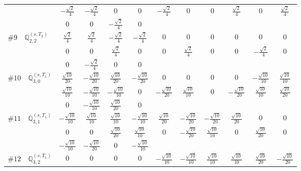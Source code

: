 \documentclass[fleqn,9pt,landscape]{jsarticle}
\begin{document}
\begin{center}
\begin{longtable}{lcccccccccc}
& $ - \frac{\sqrt{2}}{4} $ & $ - \frac{\sqrt{2}}{4} $ & $ 0 $ & $ 0 $ & $ - \frac{\sqrt{2}}{4} $ & $ 0 $ & $ 0 $ & $ \frac{\sqrt{2}}{4} $ & $ 0 $ & $ \frac{\sqrt{2}}{4} $ \\
& $ 0 $ & $ 0 $ & $ - \frac{\sqrt{2}}{4} $ & $ 0 $ & $  $ & $  $ & $  $ & $  $ & $  $ & $  $ \\ \hline
$ \#9\quad \mathbb{Q}_{2,2}^{(s,T_{2})} $ & $ \frac{\sqrt{2}}{4} $ & $ \frac{\sqrt{2}}{4} $ & $ - \frac{\sqrt{2}}{4} $ & $ - \frac{\sqrt{2}}{4} $ & $ 0 $ & $ 0 $ & $ 0 $ & $ 0 $ & $ 0 $ & $ 0 $ \\
& $ 0 $ & $ 0 $ & $ \frac{\sqrt{2}}{4} $ & $ 0 $ & $ 0 $ & $ \frac{\sqrt{2}}{4} $ & $ 0 $ & $ 0 $ & $ - \frac{\sqrt{2}}{4} $ & $ 0 $ \\
& $ 0 $ & $ - \frac{\sqrt{2}}{4} $ & $ 0 $ & $ 0 $ & $  $ & $  $ & $  $ & $  $ & $  $ & $  $ \\ \hline
$ \#10\quad \mathbb{Q}_{3,0}^{(s,T_{1})} $ & $ \frac{\sqrt{10}}{20} $ & $ - \frac{\sqrt{10}}{20} $ & $ \frac{\sqrt{10}}{20} $ & $ - \frac{\sqrt{10}}{20} $ & $ 0 $ & $ 0 $ & $ 0 $ & $ 0 $ & $ - \frac{\sqrt{10}}{10} $ & $ \frac{\sqrt{10}}{10} $ \\
& $ \frac{\sqrt{10}}{10} $ & $ - \frac{\sqrt{10}}{10} $ & $ - \frac{\sqrt{10}}{10} $ & $ 0 $ & $ - \frac{\sqrt{10}}{20} $ & $ \frac{\sqrt{10}}{10} $ & $ 0 $ & $ - \frac{\sqrt{10}}{20} $ & $ \frac{\sqrt{10}}{10} $ & $ \frac{\sqrt{10}}{20} $ \\
& $ 0 $ & $ - \frac{\sqrt{10}}{10} $ & $ \frac{\sqrt{10}}{20} $ & $ 0 $ & $  $ & $  $ & $  $ & $  $ & $  $ & $  $ \\ \hline
$ \#11\quad \mathbb{Q}_{3,1}^{(s,T_{1})} $ & $ - \frac{\sqrt{10}}{10} $ & $ \frac{\sqrt{10}}{10} $ & $ \frac{\sqrt{10}}{10} $ & $ - \frac{\sqrt{10}}{10} $ & $ \frac{\sqrt{10}}{20} $ & $ - \frac{\sqrt{10}}{20} $ & $ - \frac{\sqrt{10}}{20} $ & $ \frac{\sqrt{10}}{20} $ & $ 0 $ & $ 0 $ \\
& $ 0 $ & $ 0 $ & $ \frac{\sqrt{10}}{20} $ & $ \frac{\sqrt{10}}{10} $ & $ 0 $ & $ - \frac{\sqrt{10}}{20} $ & $ \frac{\sqrt{10}}{10} $ & $ 0 $ & $ \frac{\sqrt{10}}{20} $ & $ 0 $ \\
& $ - \frac{\sqrt{10}}{10} $ & $ - \frac{\sqrt{10}}{20} $ & $ 0 $ & $ - \frac{\sqrt{10}}{10} $ & $  $ & $  $ & $  $ & $  $ & $  $ & $  $ \\ \hline
$ \#12\quad \mathbb{Q}_{3,2}^{(s,T_{1})} $ & $ 0 $ & $ 0 $ & $ 0 $ & $ 0 $ & $ - \frac{\sqrt{10}}{10} $ & $ - \frac{\sqrt{10}}{10} $ & $ \frac{\sqrt{10}}{10} $ & $ \frac{\sqrt{10}}{10} $ & $ \frac{\sqrt{10}}{20} $ & $ - \frac{\sqrt{10}}{20} $ \\

\end{longtable}
\end{center}
\end{document}
